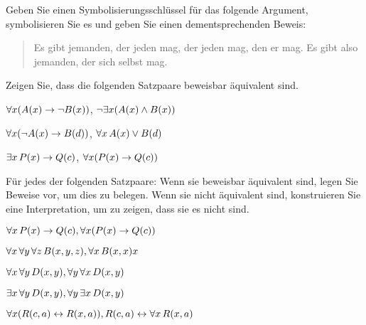 \solutions
\problempart
\label{pr.likes}
Geben Sie einen Symbolisierungsschlüssel für das folgende Argument, symbolisieren Sie es und geben Sie einen dementsprechenden Beweis:
\begin{quote}
Es gibt jemanden, der jeden mag, der jeden mag, den er mag. Es gibt also jemanden, der sich selbst mag.
\end{quote}


\problempart
Zeigen Sie, dass die folgenden Satzpaare beweisbar äquivalent sind.
\begin{earg}
\item $\forall x (\mathord{A}(x)\rightarrow \neg \mathord{B}(x))$, $\neg\exists x(\mathord{A}(x) \wedge \mathord{B}(x))$
\item $\forall x (\neg\mathord{A}(x)\rightarrow \mathord{B}(d))$, $\forall x\,\mathord{A}(x) \vee \mathord{B}(d)$
\item $\exists x\,\mathord{P}(x) \rightarrow \mathord{Q}(c)$, $\forall x (\mathord{P}(x) \rightarrow \mathord{Q}(c))$
\end{earg}

\solutions
\problempart
\label{pr.FOLequivornot}
Für jedes der folgenden Satzpaare: Wenn sie beweisbar äquivalent sind, legen Sie Beweise vor, um dies zu belegen. Wenn sie nicht äquivalent sind, konstruieren Sie eine Interpretation, um zu zeigen, dass sie es nicht sind.
\begin{earg}
\item $\forall x\,\mathord{P}(x) \rightarrow \mathord{Q}(c), \forall x (\mathord{P}(x) \rightarrow \mathord{Q}(c))$
\item $\forall x\,\forall y\, \forall z\,\mathord{B}(x,y,z), \forall x\,\mathord{B}(x,x)x$
\item $\forall x\,\forall y\,\mathord{D}(x,y), \forall y\,\forall x\,\mathord{D}(x,y)$
\item $\exists x\,\forall y\,\mathord{D}(x,y), \forall y\,\exists x\,\mathord{D}(x,y)$
\item $\forall x (\mathord{R}(c,a) \leftrightarrow \mathord{R}(x,a)), \mathord{R}(c,a) \leftrightarrow \forall x\,\mathord{R}(x,a)$
\end{earg}


